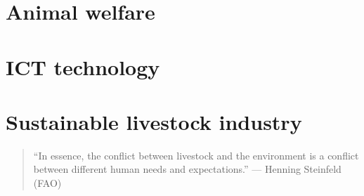 \documentclass[]{book}
\begin{document}
\chapter{Animal welfare}\label{animal-welfare}

\chapter{ICT technology}\label{ict-technology}

\chapter{Sustainable livestock
industry}\label{sustainable-livestock-industry}

\begin{quote}
``In essence, the conflict between livestock and the environment is a
conflict between different human needs and expectations.'' --- Henning
Steinfeld (FAO)
\end{quote}


\end{document}

